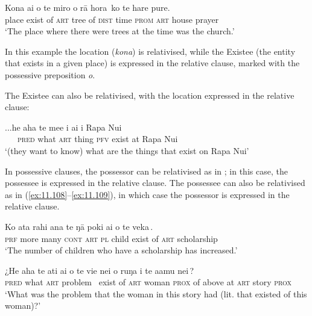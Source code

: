 \ea\label{ex:11.105}
\gll Kona {\ob}ai o te miro o rā hora\,{\cb} ko te hare pure. \\
place {\db}exist of \textsc{art} tree of \textsc{dist} time \textsc{prom} \textsc{art} house prayer \\

\glt
‘The place where there were trees at the time was the church.’ \textstyleExampleref{[R539-1.524]}
\z

In this example the location (\textit{kona}) is relativised, while the Existee (the entity that exists in a given place) is expressed in the relative clause, marked with the possessive preposition \textit{o}. 

The Existee can also be relativised, with the location expressed in the relative clause:

\ea\label{ex:11.106}
\gll ...he aha te me{\ꞌ}e {\ob}i ai {\ꞌ}i Rapa Nui\,{\cb} \\
~~~\textsc{pred} what \textsc{art} thing {\db}\textsc{pfv} exist at Rapa Nui \\

\glt
‘(they want to know) what are the things that exist on Rapa Nui’ \textstyleExampleref{[R470.006]} 
\z

In possessive clauses, the possessor can be relativised as in ; in this case, the possessee is expressed in the relative clause. The possessee can also be relativised as in (\ref{ex:11.108}–\ref{ex:11.109}), in which case the possessor is expressed in the relative clause.

\ea\label{ex:11.107}
\gll Ko {\ꞌ}ata rahi {\ꞌ}ana te ŋā poki {\ob}ai o te veka\,{\cb}. \\
\textsc{prf} more many \textsc{cont} \textsc{art} \textsc{pl} child {\db}exist of \textsc{art} scholarship \\

\glt 
‘The number of children who have a scholarship has increased.’ \textstyleExampleref{[R648.213]} 
\z

\ea\label{ex:11.108}
\gll ¿He aha te {\ꞌ}ati {\ob}ai o te vi{\ꞌ}e nei o ruŋa i te {\ꞌ}a{\ꞌ}amu nei\,{\cb}?\\
{\db}\textsc{pred} what \textsc{art} problem ~exist of \textsc{art} woman \textsc{prox} of above at \textsc{art} story \textsc{prox}\\

\glt 
‘What was the problem that the woman in this story had (lit. that existed of this woman)?’ \textstyleExampleref{[R616.603]} 
\z

